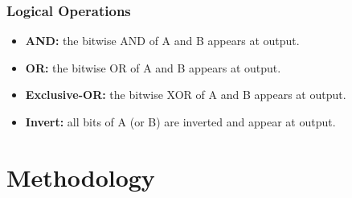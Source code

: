 \documentclass[a4paper, 12pt, twoside]{scrreprt}
\begin{document}
\subsection{Logical Operations}
\begin{itemize}
\item \textbf{AND:} the bitwise AND of A and B appears at output.
\item \textbf{OR:} the bitwise OR of A and B appears at output.
\item \textbf{Exclusive-OR:} the bitwise XOR of A and B appears at output.
\item \textbf{Invert:} all bits of A (or B) are inverted and appear at output.
\end{itemize}
\chapter{Methodology}
\setcounter{page}{3}
\end{document}
